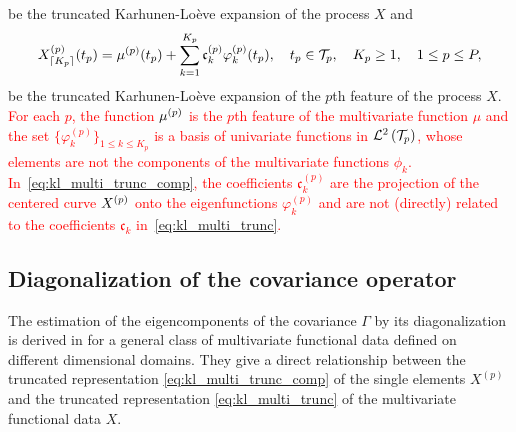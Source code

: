 be the truncated Karhunen-Loève expansion of the process $X$ and
\begin{equation}\label{eq:kl_multi_trunc_comp}
    X_{\lceil K_p \rceil}^{(p)}(t_p) = \mu^{(p)}(t_p) + \sum_{k = 1}^{K_p} \mathfrak{c}^{(p)}_k \varphi_k^{(p)}(t_p), \quad t_p \in \mathcal{T}_{p}, \quad K_p \geq 1, \quad 1 \leq p \leq P,
\end{equation}
be the truncated Karhunen-Loève expansion of the $p$th feature of the process $X$. \textcolor{red}{For each $p$, the function $\mu^{(p)}$ is the $p$th feature of the multivariate function $\mu$ and the set $\{\varphi^{(p)}_k\}_{1 \leq k \leq K_p}$ is a basis of univariate functions in $\mathcal{L}^{2}\left(\mathcal{T}_{p}\right)$, whose elements are not the components of the multivariate functions $\phi_k$. In~\eqref{eq:kl_multi_trunc_comp}, the coefficients $\mathfrak{c}^{(p)}_k$ are the projection of the centered curve $X^{(p)}$ onto the eigenfunctions $\varphi_k^{(p)}$ and are not (directly) related to the coefficients $\mathfrak{c}_k$ in~\eqref{eq:kl_multi_trunc}.}


\subsection{Diagonalization of the covariance operator} %
\label{sub:by_diagonalization_of_the_covariance_operator}

The estimation of the eigencomponents of the covariance $\Gamma$ by its diagonalization is derived in \cite{happMultivariateFunctionalPrincipal2018a} for a general class of multivariate functional data defined on different dimensional domains. They give a direct relationship between the truncated representation \eqref{eq:kl_multi_trunc_comp} of the single elements $X^{(p)}$ and the truncated representation \eqref{eq:kl_multi_trunc} of the multivariate functional data $X$.


